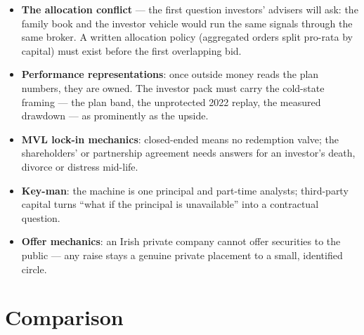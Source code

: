 \documentclass[11pt,a4paper]{article}
\begin{document}
\begin{itemize}[leftmargin=1.6em, itemsep=2pt]
\item \textbf{The allocation conflict} --- the first question investors'
      advisers will ask: the family book and the investor vehicle would run
      the same signals through the same broker. A written allocation policy
      (aggregated orders split pro-rata by capital) must exist before the
      first overlapping bid.
\item \textbf{Performance representations}: once outside money reads the plan
      numbers, they are owned. The investor pack must carry the cold-state
      framing --- the plan band, the unprotected 2022 replay, the measured
      drawdown --- as prominently as the upside.
\item \textbf{MVL lock-in mechanics}: closed-ended means no redemption valve;
      the shareholders' or partnership agreement needs answers for an
      investor's death, divorce or distress mid-life.
\item \textbf{Key-man}: the machine is one principal and part-time analysts;
      third-party capital turns ``what if the principal is unavailable''
      into a contractual question.
\item \textbf{Offer mechanics}: an Irish private company cannot offer
      securities to the public --- any raise stays a genuine private
      placement to a small, identified circle.
\end{itemize}

\section{Comparison}
\end{document}
